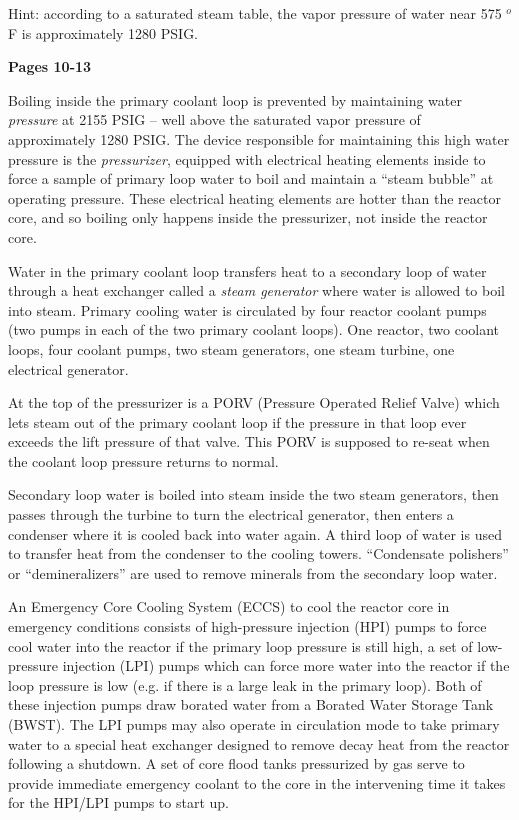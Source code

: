 
Hint: according to a saturated steam table, the vapor pressure of water near 575 $^{o}$F is approximately 1280 PSIG.







\noindent
{\bf Pages 10-13}

Boiling inside the primary coolant loop is prevented by maintaining water {\it pressure} at 2155 PSIG -- well above the saturated vapor pressure of approximately 1280 PSIG.  The device responsible for maintaining this high water pressure is the {\it pressurizer}, equipped with electrical heating elements inside to force a sample of primary loop water to boil and maintain a ``steam bubble'' at operating pressure.  These electrical heating elements are hotter than the reactor core, and so boiling only happens inside the pressurizer, not inside the reactor core.

Water in the primary coolant loop transfers heat to a secondary loop of water through a heat exchanger called a {\it steam generator} where water is allowed to boil into steam.  Primary cooling water is circulated by four reactor coolant pumps (two pumps in each of the two primary coolant loops).  One reactor, two coolant loops, four coolant pumps, two steam generators, one steam turbine, one electrical generator.

At the top of the pressurizer is a PORV (Pressure Operated Relief Valve) which lets steam out of the primary coolant loop if the pressure in that loop ever exceeds the lift pressure of that valve.  This PORV is supposed to re-seat when the coolant loop pressure returns to normal.

Secondary loop water is boiled into steam inside the two steam generators, then passes through the turbine to turn the electrical generator, then enters a condenser where it is cooled back into water again.  A third loop of water is used to transfer heat from the condenser to the cooling towers.  ``Condensate polishers'' or ``demineralizers'' are used to remove minerals from the secondary loop water.

An Emergency Core Cooling System (ECCS) to cool the reactor core in emergency conditions consists of high-pressure injection (HPI) pumps to force cool water into the reactor if the primary loop pressure is still high, a set of low-pressure injection (LPI) pumps which can force more water into the reactor if the loop pressure is low (e.g. if there is a large leak in the primary loop).  Both of these injection pumps draw borated water from a Borated Water Storage Tank (BWST).  The LPI pumps may also operate in circulation mode to take primary water to a special heat exchanger designed to remove decay heat from the reactor following a shutdown.  A set of core flood tanks pressurized by gas serve to provide immediate emergency coolant to the core in the intervening time it takes for the HPI/LPI pumps to start up.

